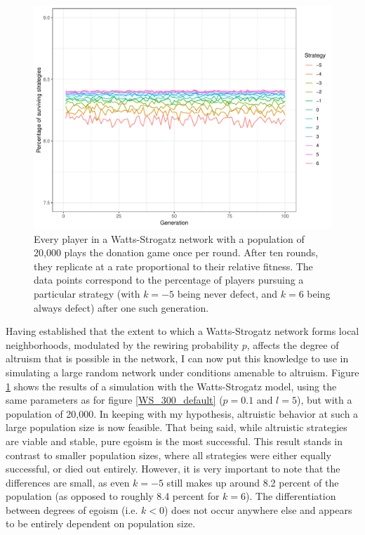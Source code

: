 \documentclass[12pt]{article}
\begin{document}
\begin{figure}
    \centering
    \includegraphics[width=\linewidth]{../figures/results_WS_20000_p005.pdf}
    \caption{Every player in a Watts-Strogatz network with a population of 20,000 plays the donation game once per round. After ten rounds, they replicate at a rate proportional to their relative fitness. The data points correspond to the percentage of players pursuing a particular strategy (with $k=-5$ being never defect, and $k=6$ being always defect) after one such generation.}
    \label{WS_20000_default}
\end{figure}

Having established that the extent to which a Watts-Strogatz network forms local neighborhoods, modulated by the rewiring probability $p$, affects the degree of altruism that is possible in the network, I can now put this knowledge to use in simulating a large random network under conditions amenable to altruism. Figure \ref{WS_20000_default} shows the results of a simulation with the Watts-Strogatz model, using the same parameters as for figure \ref{WS_300_default} ($p=0.1$ and $l=5$), but with a population of 20,000. In keeping with my hypothesis, altruistic behavior at such a large population size is now feasible. That being said, while altruistic strategies are viable and stable, pure egoism is the most successful. This result stands in contrast to smaller population sizes, where all strategies were either equally successful, or died out entirely. However, it is very important to note that the differences are small, as even $k=-5$ still makes up around 8.2 percent of the population (as opposed to roughly 8.4 percent for $k=6$). The differentiation between degrees of egoism (i.e. $k<0$) does not occur anywhere else and appears to be entirely dependent on population size.
\end{document}
